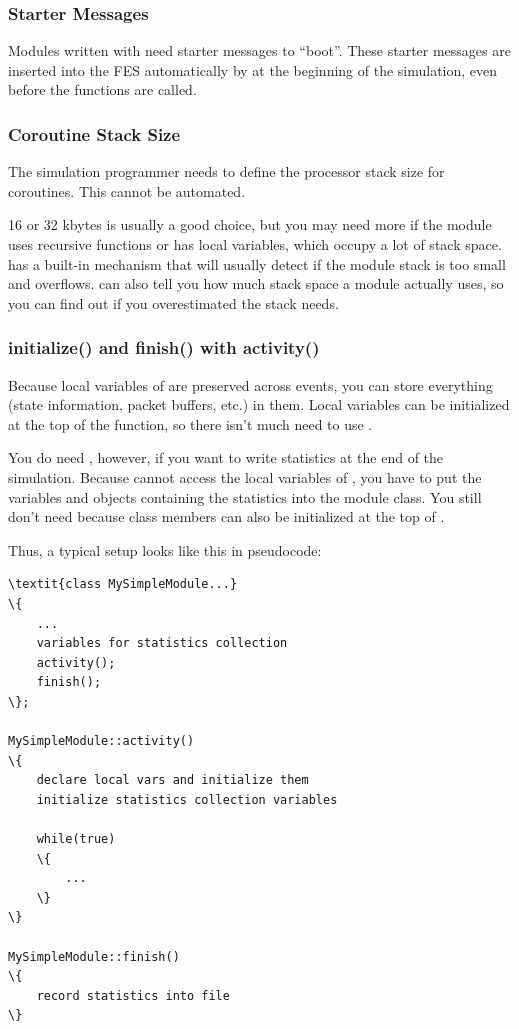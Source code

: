 \subsubsection{Starter Messages}


Modules written with  need starter
messages to ``boot''.  These starter messages
are inserted into the FES automatically by {\opp} at the
beginning of the simulation, even before the 
functions are called.


\subsubsection{Coroutine Stack Size}


The simulation programmer needs to define the processor stack size
for coroutines. This cannot be automated.

16 or 32 kbytes is usually a good choice, but you may need more if the
module uses recursive functions or has local variables, which occupy a
lot of stack space. {\opp} has a built-in mechanism that will usually
detect if the module stack is too small and overflows.
{\opp} can also tell you how much stack space a module actually uses,
so you can find out if you overestimated the stack needs.


\subsubsection{initialize() and finish() with activity()}


Because local variables of  are preserved across
events, you can store everything (state information, packet buffers,
etc.) in them. Local variables can be initialized at the top of the
 function, so there isn't much need to use
.


You do need , however, if you want to write statistics at
the end of the simulation. Because  cannot access
the local variables of , you have to put the variables
and objects containing the statistics into the module class.
You still don't need  because class members can also
be initialized at the top of .


Thus, a typical setup looks like this in pseudocode:


\begin{Verbatim}[commandchars=\\\{\}]
\textit{class MySimpleModule...}
\{
    ...
    variables for statistics collection
    activity();
    finish();
\};

MySimpleModule::activity()
\{
    declare local vars and initialize them
    initialize statistics collection variables

    while(true)
    \{
        ...
    \}
\}

MySimpleModule::finish()
\{
    record statistics into file
\}
\end{Verbatim}



